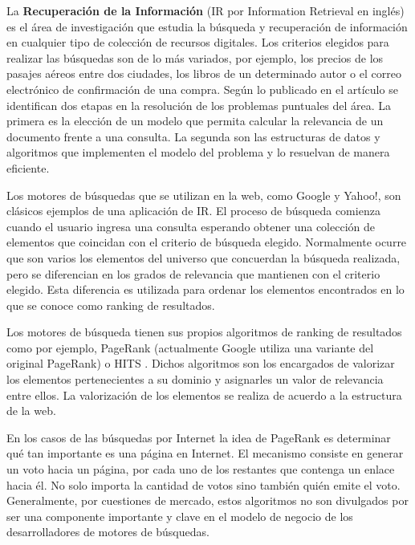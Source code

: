 La \textbf{Recuperación de la Información} (IR por Information Retrieval en inglés) \cite{Baeza-Yates:1999:MIR:553876,Manning:2008:IIR:1394399,Zobel:2006:IFT:1132956.1132959} es el área de investigación que estudia la búsqueda y recuperación de información en cualquier tipo de colección de recursos digitales. Los criterios elegidos para realizar las búsquedas son de lo más variados, por ejemplo, los precios de los pasajes aéreos entre dos ciudades, los libros de un determinado autor o el correo electrónico de confirmación de una compra. Según lo publicado en el artículo \cite{Baeza-Yates:1999:MIR:553876} se identifican dos etapas en la resolución de los problemas puntuales del área. La primera es la elección de un modelo que permita calcular la relevancia de un documento frente a una consulta. La segunda son las estructuras de datos y algoritmos que implementen el modelo del problema y lo resuelvan de manera eficiente.

Los motores de búsquedas que se utilizan en la web, como Google y Yahoo!, son clásicos ejemplos de una aplicación de IR. El proceso de búsqueda comienza cuando el usuario ingresa una consulta esperando obtener una colección de elementos que coincidan con el criterio de búsqueda elegido. Normalmente ocurre que son varios los elementos del universo que concuerdan la búsqueda realizada, pero se diferencian en los grados de relevancia que mantienen con el criterio elegido. Esta diferencia es utilizada para ordenar los elementos encontrados en lo que se conoce como ranking de resultados.

Los motores de búsqueda tienen sus propios algoritmos de ranking de resultados como por ejemplo, PageRank (actualmente Google utiliza una variante del original PageRank) \cite{Brin:1998:ALH:297810.297827} o HITS \cite{Kleinberg:1999:ASH:324133.324140}. Dichos algoritmos son los encargados de valorizar los elementos pertenecientes a su dominio y asignarles un valor de relevancia entre ellos. La valorización de los elementos se realiza de acuerdo a la estructura de la web.

En los casos de las búsquedas por Internet la idea de PageRank \cite{Brin:1998:ALH:297810.297827} es determinar qué tan importante es una página en Internet. El mecanismo consiste en generar un voto hacia un página, por cada uno de los restantes que contenga un enlace hacia él. No solo importa la cantidad de votos sino también quién emite el voto. Generalmente, por cuestiones de mercado, estos algoritmos no son divulgados por ser una componente importante y clave en el modelo de negocio de los desarrolladores de motores de búsquedas. 


